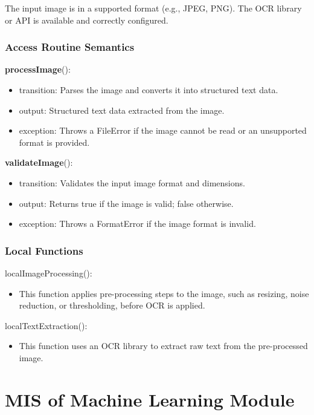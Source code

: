 \documentclass[12pt, titlepage]{article}
\begin{document}
The input image is in a supported format (e.g., JPEG, PNG). The OCR library or API is available and correctly configured.

\subsubsection{Access Routine Semantics}

\noindent \textbf{processImage}():
\begin{itemize}
\item transition: Parses the image and converts it into structured text data.
\item output: Structured text data extracted from the image.
\item exception: Throws a FileError if the image cannot be read or an unsupported format is provided.
\end{itemize}

\noindent \textbf{validateImage}():
\begin{itemize}
\item transition: Validates the input image format and dimensions.
\item output: Returns true if the image is valid; false otherwise.
\item exception: Throws a FormatError if the image format is invalid.
\end{itemize}

\subsubsection{Local Functions}

localImageProcessing():
\begin{itemize}
\item This function applies pre-processing steps to the image, such as resizing, noise reduction, or thresholding, before OCR is applied.
\end{itemize}

localTextExtraction():
\begin{itemize}
\item This function uses an OCR library to extract raw text from the pre-processed image.
\end{itemize}

\newpage



\section{MIS of Machine Learning Module}\label{ML_Module}
\end{document}
